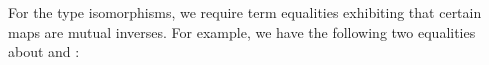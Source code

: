 \begin{AgdaAlign}
For the type isomorphisms, we require term equalities exhibiting that certain maps are mutual inverses.
For example, we have the following two equalities about  and :

\begin{code}%
%
\>[4]\AgdaSpace{}%
\AgdaSymbol{:}\AgdaSpace{}%
\AgdaSpace{}%
\AgdaSymbol{\{}\AgdaSymbol{\}}\AgdaSpace{}%
\AgdaSymbol{\{}\AgdaSymbol{\}}\AgdaSpace{}%
\AgdaSymbol{(}\AgdaSpace{}%
\AgdaSymbol{:}\AgdaSpace{}%
\AgdaSpace{}%
\AgdaSpace{}%
\AgdaSymbol{(}\AgdaSpace{}%
\AgdaSymbol{(}\AgdaSpace{}%
\AgdaSymbol{)))}\AgdaSpace{}%
\AgdaSpace{}%
\AgdaSpace{}%
\AgdaSpace{}%
\AgdaOperator{\AgdaFunction{\$}}\AgdaSpace{}%
\AgdaSymbol{(}\AgdaSpace{}%
\AgdaSpace{}%
\AgdaOperator{\AgdaFunction{\$}}\AgdaSpace{}%
\AgdaSymbol{)}\AgdaSpace{}%
\AgdaSpace{}%
\<%
\\
%
\>[4]\AgdaSpace{}%
\AgdaSymbol{:}\AgdaSpace{}%
\AgdaSpace{}%
\AgdaSymbol{\{}\AgdaSymbol{\}}\AgdaSpace{}%
\AgdaSymbol{\{}\AgdaSymbol{\}}\AgdaSpace{}%
\AgdaSymbol{(}\AgdaSpace{}%
\AgdaSymbol{:}\AgdaSpace{}%
\AgdaSpace{}%
\AgdaSpace{}%
\AgdaSymbol{)}\AgdaSpace{}%
\AgdaSpace{}%
\AgdaSpace{}%
\AgdaSpace{}%
\AgdaOperator{\AgdaFunction{\$}}\AgdaSpace{}%
\AgdaSymbol{(}\AgdaSpace{}%
\AgdaSpace{}%
\AgdaOperator{\AgdaFunction{\$}}\AgdaSpace{}%
\AgdaSymbol{)}\AgdaSpace{}%
\AgdaSpace{}%
\<%
\end{code}


\end{AgdaAlign}
